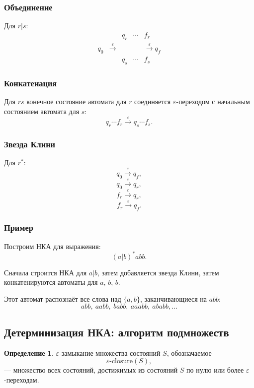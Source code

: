 \documentclass[12pt,a4paper]{article}
\theoremstyle{definition}
\newtheorem{definition}{Определение}
\theoremstyle{plain}
\begin{document}
\subsubsection*{Объединение}

Для $r|s$:
\[
\begin{array}{ccccc}
& & q_r & \cdots & f_r \\
q_0 & \xrightarrow{\varepsilon} & & & \xrightarrow{\varepsilon} q_f\\
& & q_s & \cdots & f_s
\end{array}
\]

\subsubsection*{Конкатенация}

Для $rs$ конечное состояние автомата для $r$ соединяется $\varepsilon$-переходом с начальным состоянием автомата для $s$:
\[
q_r \cdots f_r \xrightarrow{\varepsilon} q_s \cdots f_s.
\]

\subsubsection*{Звезда Клини}

Для $r^*$:
\[
q_0 \xrightarrow{\varepsilon} q_f,
\]
\[
q_0 \xrightarrow{\varepsilon} q_r,
\]
\[
f_r \xrightarrow{\varepsilon} q_r,
\]
\[
f_r \xrightarrow{\varepsilon} q_f.
\]

\subsubsection*{Пример}

Построим НКА для выражения:
\[
(a|b)^*abb.
\]

Сначала строится НКА для $a|b$, затем добавляется звезда Клини, затем конкатенируются автоматы для $a$, $b$, $b$.

Этот автомат распознаёт все слова над $\{a,b\}$, заканчивающиеся на $abb$:
\[
abb,\ aabb,\ babb,\ aaabb,\ ababb,\ldots
\]

\subsection{Детерминизация НКА: алгоритм подмножеств}

\begin{definition}
$\varepsilon$-замыкание множества состояний $S$, обозначаемое
\[
\varepsilon\text{-closure}(S),
\]
--- множество всех состояний, достижимых из состояний $S$ по нулю или более $\varepsilon$-переходам.
\end{definition}
\end{document}
